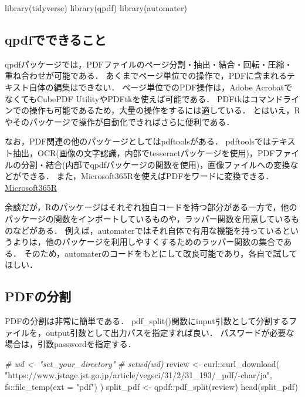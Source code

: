 \documentclass[
]{article}
\newenvironment{Shaded}{\begin{snugshade}}{\end{snugshade}}
\newcommand{\AttributeTok}[1]{\textcolor[rgb]{0.77,0.63,0.00}{#1}}
\newcommand{\CommentTok}[1]{\textcolor[rgb]{0.56,0.35,0.01}{\textit{#1}}}
\newcommand{\FunctionTok}[1]{\textcolor[rgb]{0.00,0.00,0.00}{#1}}
\newcommand{\NormalTok}[1]{#1}
\newcommand{\OtherTok}[1]{\textcolor[rgb]{0.56,0.35,0.01}{#1}}
\newcommand{\SpecialCharTok}[1]{\textcolor[rgb]{0.00,0.00,0.00}{#1}}
\newcommand{\StringTok}[1]{\textcolor[rgb]{0.31,0.60,0.02}{#1}}
\begin{document}
\begin{Shaded}
\begin{Highlighting}[]
\FunctionTok{library}\NormalTok{(tidyverse)}
\FunctionTok{library}\NormalTok{(qpdf)}
\FunctionTok{library}\NormalTok{(automater)}
\end{Highlighting}
\end{Shaded}

\hypertarget{qpdfux3067ux3067ux304dux308bux3053ux3068}{%
\subsection{qpdfでできること}\label{qpdfux3067ux3067ux304dux308bux3053ux3068}}

qpdfパッケージでは，PDFファイルのページ分割・抽出・結合・回転・圧縮・重ね合わせが可能である．
あくまでページ単位での操作で，PDFに含まれるテキスト自体の編集はできない．
ページ単位でのPDF操作は，Adobe AcrobatでなくてもCubePDF UtilityやPDFtkを使えば可能である．
PDFtkはコマンドラインでの操作も可能であるため，大量の操作をするには適している．
とはいえ，Rやそのパッケージで操作が自動化できればさらに便利である．

なお，PDF関連の他のパッケージとしてはpdftoolsがある．
pdftoolsではテキスト抽出，OCR(画像の文字認識，内部でtesseractパッケージを使用)，PDFファイルの分割・結合(内部でqpdfパッケージの関数を使用)，画像ファイルへの変換などができる．
また，Microsoft365Rを使えばPDFをワードに変換できる．
\protect\hyperlink{microsoft365r}{Microsoft365R}

余談だが，Rのパッケージはそれぞれ独自コードを持つ部分がある一方で，他のパッケージの関数をインポートしているものや，ラッパー関数を用意しているものなどがある．
例えば，automaterではそれ自体で有用な機能を持っているというよりは，他のパッケージを利用しやすくするためのラッパー関数の集合である．
そのため，automaterのコードをもとにして改良可能であり，各自で試してほしい．

\hypertarget{pdfux306eux5206ux5272}{%
\subsection{PDFの分割}\label{pdfux306eux5206ux5272}}

PDFの分割は非常に簡単である．
pdf\_split()関数にinput引数として分割するファイルを，output引数として出力パスを指定すれば良い．
パスワードが必要な場合は，引数passwordを指定する．

\begin{Shaded}
\begin{Highlighting}[]
  \CommentTok{\# wd \textless{}{-} "set\_your\_directory"}
  \CommentTok{\# setwd(wd)}
\NormalTok{review }\OtherTok{\textless{}{-}} 
\NormalTok{  curl}\SpecialCharTok{::}\FunctionTok{curl\_download}\NormalTok{(}
    \StringTok{"https://www.jstage.jst.go.jp/article/vegsci/31/2/31\_193/\_pdf/{-}char/ja"}\NormalTok{, }
\NormalTok{    fs}\SpecialCharTok{::}\FunctionTok{file\_temp}\NormalTok{(}\AttributeTok{ext =} \StringTok{"pdf"}\NormalTok{)}
\NormalTok{    )}
\NormalTok{split\_pdf }\OtherTok{\textless{}{-}}\NormalTok{ qpdf}\SpecialCharTok{::}\FunctionTok{pdf\_split}\NormalTok{(review)}
\FunctionTok{head}\NormalTok{(split\_pdf)}
\end{Highlighting}
\end{Shaded}
\end{document}
